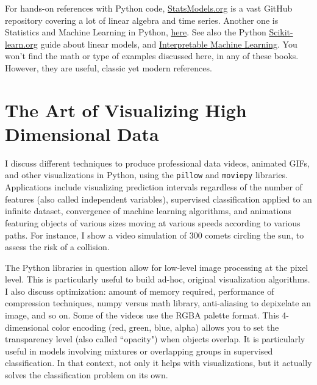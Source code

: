 \documentclass[oneside,10pt]{book}
\newcommand\Chapter[2]{
  \chapter[#1]{#1\\[2ex]\Large\itshape#2}
}
\renewcommand{\arraystretch}{1.4} %
\begin{document}
For hands-on references with Python code, \href{https://www.statsmodels.org/stable/user-guide.html}{StatsModels.org} is a vast GitHub repository  covering a lot of linear algebra and time series. Another one is Statistics and Machine Learning in Python, \href{https://duchesnay.github.io/pystatsml/}{here}. See also the Python \href{https://scikit-learn.org/0.15/modules/linear_model.html}{Scikit-learn.org} guide about linear models,
and \href{https://christophm.github.io/interpretable-ml-book/limo.html}{Interpretable Machine Learning}. You won't find the math or type of examples discussed here, in any of these books. However, they are useful, classic yet modern references.





\renewcommand{\arraystretch}{1.4} %

\Chapter{The Art of Visualizing High Dimensional Data}{}\label{chapvisu}


I discuss different techniques  to produce professional data videos, animated GIFs, and other visualizations in Python,
using the \texttt{pillow} and \texttt{moviepy} libraries. Applications include visualizing prediction intervals regardless of the number of features (also called independent variables), supervised classification applied to an infinite dataset, convergence of machine learning algorithms, and animations featuring objects of various sizes moving at various speeds according to various paths. For instance, I show a video simulation of 300 comets circling the sun, to assess the risk of a collision.

The Python libraries in question
allow for low-level image processing at the pixel level. This is particularly useful to build ad-hoc, original visualization algorithms.  I also discuss  optimization:
amount of memory required, performance of compression techniques, numpy versus math library, anti-aliasing to depixelate an image, and so on. Some of the videos use the RGBA palette format.
This 4-dimensional color encoding (red, green, blue, alpha) allows you to set the transparency level (also called ``opacity") when objects overlap. It is particularly useful in models involving mixtures or overlapping groups in supervised classification. In that context, not only it helps with visualizations, but it actually solves the classification problem on its own.
\end{document}
